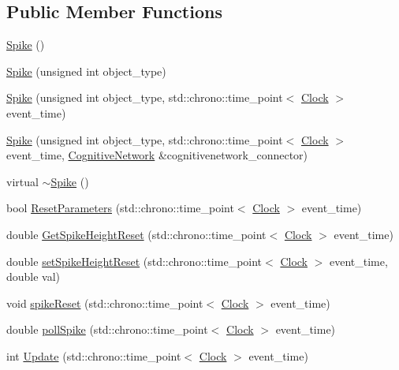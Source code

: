 \subsection*{Public Member Functions}
\begin{DoxyCompactItemize}
\item 
\hyperlink{class_spike_a1f82ea9e43a3a71b878261753c722dd9}{Spike} ()
\item 
\hyperlink{class_spike_a3e6dbba4e235f7adb02ade45c918b266}{Spike} (unsigned int object\+\_\+type)
\item 
\hyperlink{class_spike_a9368fb7b20887e5f02f3de6176f04c02}{Spike} (unsigned int object\+\_\+type, std\+::chrono\+::time\+\_\+point$<$ \hyperlink{universe_8h_a0ef8d951d1ca5ab3cfaf7ab4c7a6fd80}{Clock} $>$ event\+\_\+time)
\item 
\hyperlink{class_spike_afecf811f48103b529016a73349b50fe4}{Spike} (unsigned int object\+\_\+type, std\+::chrono\+::time\+\_\+point$<$ \hyperlink{universe_8h_a0ef8d951d1ca5ab3cfaf7ab4c7a6fd80}{Clock} $>$ event\+\_\+time, \hyperlink{class_cognitive_network}{Cognitive\+Network} \&cognitivenetwork\+\_\+connector)
\item 
virtual \hyperlink{class_spike_a6c2c62e81cb32ca4eb73bc686974d00d}{$\sim$\+Spike} ()
\item 
bool \hyperlink{class_spike_af4475560da7a33e70a0f2036197f000f}{Reset\+Parameters} (std\+::chrono\+::time\+\_\+point$<$ \hyperlink{universe_8h_a0ef8d951d1ca5ab3cfaf7ab4c7a6fd80}{Clock} $>$ event\+\_\+time)
\item 
double \hyperlink{class_spike_a6266871881a2581aaee499f6a10e1841}{Get\+Spike\+Height\+Reset} (std\+::chrono\+::time\+\_\+point$<$ \hyperlink{universe_8h_a0ef8d951d1ca5ab3cfaf7ab4c7a6fd80}{Clock} $>$ event\+\_\+time)
\item 
double \hyperlink{class_spike_aed9745a5883c2f611def65b4e527287f}{set\+Spike\+Height\+Reset} (std\+::chrono\+::time\+\_\+point$<$ \hyperlink{universe_8h_a0ef8d951d1ca5ab3cfaf7ab4c7a6fd80}{Clock} $>$ event\+\_\+time, double val)
\item 
void \hyperlink{class_spike_acce1cc96e84e7cbf3b68010ab32f045e}{spike\+Reset} (std\+::chrono\+::time\+\_\+point$<$ \hyperlink{universe_8h_a0ef8d951d1ca5ab3cfaf7ab4c7a6fd80}{Clock} $>$ event\+\_\+time)
\item 
double \hyperlink{class_spike_ac465dbe6500f1eb1f5421f7174f91dd3}{poll\+Spike} (std\+::chrono\+::time\+\_\+point$<$ \hyperlink{universe_8h_a0ef8d951d1ca5ab3cfaf7ab4c7a6fd80}{Clock} $>$ event\+\_\+time)
\item 
int \hyperlink{class_spike_a683a0ca5e62e68777381fc85f4bf3019}{Update} (std\+::chrono\+::time\+\_\+point$<$ \hyperlink{universe_8h_a0ef8d951d1ca5ab3cfaf7ab4c7a6fd80}{Clock} $>$ event\+\_\+time)
\end{DoxyCompactItemize}
